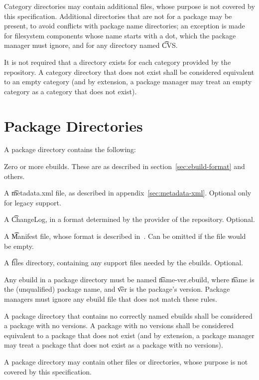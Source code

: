 Category directories may contain additional files, whose purpose is not covered by this
specification. Additional directories that are not for a package may  be present, to avoid
conflicts with package name directories; an exception is made for filesystem components whose name
starts with a dot, which the package manager must ignore, and for any directory named \t{CVS}.

It is not required that a directory exists for each category provided by the repository. A category
directory that does not exist shall be considered equivalent to an empty category (and by extension,
a package manager may treat an empty category as a category that does not exist).

\section{Package Directories}
\label{sec:package-dirs}

A package directory contains the following:
\begin{compactitem}
\item Zero or more ebuilds. These are as described in section~\ref{sec:ebuild-format} and others.
\item A \t{metadata.xml} file, as described in appendix~\ref{sec:metadata-xml}\@. Optional only for
    legacy support.
\item A \t{ChangeLog}, in a format determined by the provider of the repository. Optional.
\item A \t{Manifest} file, whose format is described in~\cite{Glep44}. Can be omitted if the file
    would be empty.
\item A \t{files} directory, containing any support files needed by the ebuilds. Optional.
\end{compactitem}

Any ebuild in a package directory must be named \t{name-ver.ebuild}, where \t{name} is the
(unqualified) package name, and \t{ver} is the package's version. Package managers must ignore
any ebuild file that does not match these rules.

A package directory that contains no correctly named ebuilds shall be considered a package with no
versions. A package with no versions shall be considered equivalent to a package that does not
exist (and by extension, a package manager may treat a package that does not exist as a package
with no versions).

A package directory may contain other files or directories, whose purpose is not covered by
this specification.

